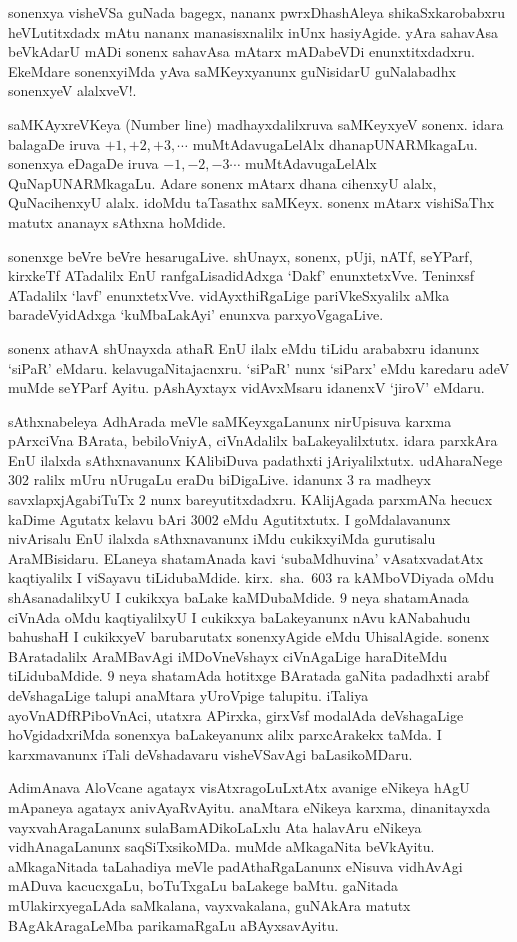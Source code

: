sonenxya visheVSa guNada bagegx, nananx pwrxDhashAleya shikaSxkarobabxru heVLutitxdadx mAtu nananx manasisxnalilx inUnx hasiyAgide. yAra sahavAsa beVkAdarU mADi sonenx sahavAsa mAtarx mADabeVDi enunxtitxdadxru. EkeMdare sonenxyiMda yAva saMKeyxyanunx guNisidarU guNalabadhx sonenxyeV alalxveV!.

saMKAyxreVKeya {\rm (Number line)} madhayxdalilxruva saMKeyxyeV sonenx. idara bala\-gaDe iruva $+1,+2,+3,\cdots$ muMtAdavugaLelAlx dhanapUNARMkagaLu. sonenxya eDagaDe iruva $-1,-2,-3\cdots$ muMtAdavugaLelAlx QuNapUNARMkagaLu. Adare sonenx mAtarx dhana cihenxyU alalx, QuNacihenxyU alalx. idoMdu taTasathx saMKeyx. sonenx mAtarx vishiSaThx matutx ananayx sAthxna hoMdide.

sonenxge beVre beVre hesarugaLive. shUnayx, sonenx, pUji, nATf, seYParf, kirxkeTf ATadalilx EnU ranfgaLisadidAdxga `Dakf' enunxtetxVve. Teninxsf ATadalilx `lavf' enunxtetxVve. vidAyxthiRgaLige pariVkeSxyalilx aMka baradeVyidAdxga `kuMbaLakAyi' enunxva parxyoVgagaLive.

sonenx athavA shUnayxda athaR EnU ilalx eMdu tiLidu arababxru idanunx `siPaR' eMdaru. kelavugaNitajacnxru. `siPaR' nunx `siParx' eMdu karedaru adeV muMde seYParf Ayitu. pAshAyxtayx vidAvxMsaru idanenxV `jiroV' eMdaru.

sAthxnabeleya AdhArada meVle saMKeyxgaLanunx nirUpisuva karxma pArxciVna BArata, bebiloVniyA, ciVnAdalilx baLakeyalilxtutx. idara parxkAra EnU ilalxda sAthxnavanunx KAlibiDuva padathxti jAriyalilxtutx. udAharaNege $302$ ralilx mUru nUrugaLu eraDu biDigaLive. idanunx $3$ ra madheyx savxlapxjAgabiTuTx $2$ nunx bareyutitxdadxru. KAli\-jAgada parxmANa hecucx kaDime Agutatx kelavu bAri $3002$ eMdu Agutitxtutx. I goMdalavanunx nivArisalu EnU ilalxda sAthxnavanunx iMdu cukikxyiMda gurutisalu AraMBisidaru. ELaneya shatamAnada kavi `subaMdhuvina' vAsatxvadatAtx kaqtiyalilx I viSayavu tiLidubaMdide. kirx.~sha.\ $603$ ra kAMboVDiyada oMdu shAsana\-dalilxyU I cukikxya baLake kaMDubaMdide. $9$ neya shatamAnada ciVnAda oMdu kaqtiyalilxyU I cukikxya baLakeyanunx nAvu kANabahudu bahushaH I cukikxyeV barubarutatx sonenxyAgide eMdu UhisalAgide. sonenx BAratadalilx AraMBavAgi iMDoVneVshayx ciVnAgaLige haraDiteMdu tiLidubaMdide. $9$ neya shatamAda hotitxge BAratada gaNita \-padadhxti arabf deVshagaLige talupi anaMtara yUroVpige talupitu. iTaliya ayoVnADfRPiboVnAci, utatxra APirxka, girxVsf modalAda deVshagaLige hoVgidadxriMda sonenxya baLakeyanunx alilx parxcArakekx taMda. I karxmavanunx iTali deVshadavaru visheVSavAgi \-baLasikoMDaru.  

AdimAnava AloVcane agatayx visAtxragoLuLxtAtx avanige eNikeya hAgU mApaneya agatayx anivAyaRvAyitu. anaMtara eNikeya karxma, dinanitayxda vayxvahAra\-gaLanunx sulaBamADikoLaLxlu Ata halavAru eNikeya vidhAnagaLanunx saqSiTxsikoMDa. muMde aMkagaNita beVkAyitu. aMkagaNitada taLahadiya meVle padAthaRgaLanunx eNisuva vidhAvAgi mADuva kacucxgaLu, boTuTxgaLu baLakege baMtu. gaNitada mUla\-kirxyegaLAda saMkalana, vayxvakalana, guNAkAra matutx BAgAkAragaLeMba parikamaRgaLu aBAyxsavAyitu.

